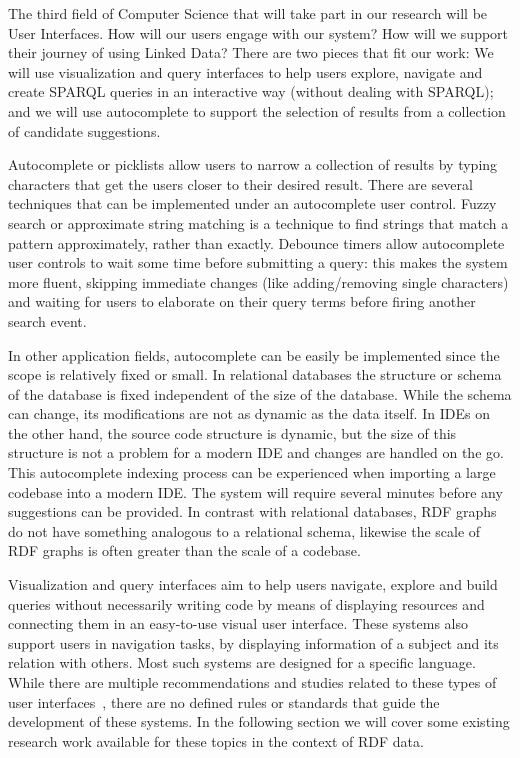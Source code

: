 The third field of Computer Science that will take part in our research will be User Interfaces. How will our users engage with our system? How will we support their journey of using Linked Data? There are two pieces that fit our work: We will use visualization and query interfaces to help users explore, navigate and create SPARQL queries in an interactive way (without dealing with SPARQL); and we will use autocomplete to support the selection of results from a collection of candidate suggestions. 

Autocomplete or picklists allow users to narrow a collection of results by typing characters that get the users closer to their desired result. There are several techniques that can be implemented under an autocomplete user control. Fuzzy search or approximate string matching is a technique to find strings that match a pattern approximately, rather than exactly. Debounce timers allow autocomplete user controls to wait some time before submitting a query: this makes the system more fluent, skipping immediate changes (like adding/removing single characters) and waiting for users to elaborate on their query terms before firing another search event.

In other application fields, autocomplete can be easily be implemented since the scope is relatively fixed or small. In relational databases the structure or schema of the database is fixed independent of the size of the database. While the schema can change, its modifications are not as dynamic as the data itself. In IDEs on the other hand, the source code structure is dynamic, but the size of this structure is not a problem for a modern IDE and changes are handled on the go. This autocomplete indexing process can be experienced when importing a large codebase into a modern IDE. The system will require several minutes before any suggestions can be provided. In contrast with relational databases, RDF graphs do not have something analogous to a relational schema, likewise the scale of RDF graphs is often greater than the scale of a codebase.

Visualization and query interfaces aim to help users navigate, explore and build queries without necessarily writing code by means of displaying resources and connecting them in an easy-to-use visual user interface. These systems also support users in navigation tasks, by displaying information of a subject and its relation with others. Most such systems are designed for a specific language. While there are multiple recommendations and studies related to these types of user interfaces~\cite{Dadzie2011, Bikakis2016}, there are no defined rules or standards that guide the development of these systems. In the following section we will cover some existing research work available for these topics in the context of RDF data.

